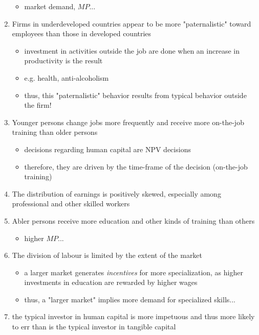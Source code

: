 \documentclass[12pt,a4paper]{article}
\begin{document}
\begin{enumerate}
\begin{itemize}
        \item market demand, $MP$...
      \end{itemize}
    \item Firms in underdeveloped countries appear to be more
      "paternalistic" toward employees than those in developed countries
      \begin{itemize}
        \item investment in activities outside the job are done when an
          increase in productivity is the result
        \item e.g. health, anti-alcoholism
        \item thus, this "paternalistic" behavior results from typical
          behavior outside the firm!
      \end{itemize}
    \item Younger persons change jobs more frequently and receive more
      on-the-job training than older persons
      \begin{itemize}
        \item decisions regarding human capital are NPV decisions
        \item therefore, they are driven by the time-frame of the
          decision (on-the-job training)
      \end{itemize}
    \item The distribution of earnings is positively skewed, especially
      among professional and other skilled workers
    \item Abler persons receive more education and other kinds of
      training than others
      \begin{itemize}
        \item higher $MP$...
      \end{itemize}
    \item The division of labour is limited by the extent of the
      market
      \begin{itemize}
        \item a larger market generates \emph{incentives} for more
          specialization, as higher investments in education are
          rewarded by higher wages
        \item thus, a "larger market" implies more demand for
          specialized skills...
      \end{itemize}
    \item the typical investor in human capital is more impetuous and thus
      more likely to err than is the typical investor in tangible capital
  \end{enumerate}
\end{document}
